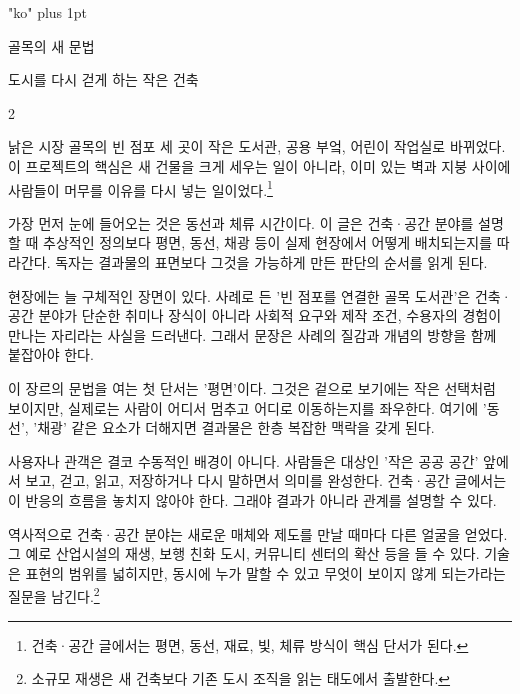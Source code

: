 \documentclass[9.5pt]{memoir}
\begin{document}
\XeTeXlinebreaklocale "ko"
\XeTeXlinebreakskip=0pt plus 1pt

\renewcommand{\imprintrunninghead}{골목 재생}
\pagestyle{imprint}


\begin{center}
{\noindent\hone 골목의 새 문법\par}
\vspace{\imprintheadinggap}

{\noindent\htwo 도시를 다시 걷게 하는 작은 건축\par}
\end{center}


\begin{multicols*}{2}

{\bodyf\noindent 낡은 시장 골목의 빈 점포 세 곳이 작은 도서관, 공용 부엌, 어린이 작업실로 바뀌었다. 이 프로젝트의 핵심은 새 건물을 크게 세우는 일이 아니라, 이미 있는 벽과 지붕 사이에 사람들이 머무를 이유를 다시 넣는 일이었다.\footnote{건축·공간 글에서는 평면, 동선, 재료, 빛, 체류 방식이 핵심 단서가 된다.}\par}


{\bodyf\noindent 가장 먼저 눈에 들어오는 것은 동선과 체류 시간이다. 이 글은 건축·공간 분야를 설명할 때 추상적인 정의보다 평면, 동선, 채광 등이 실제 현장에서 어떻게 배치되는지를 따라간다. 독자는 결과물의 표면보다 그것을 가능하게 만든 판단의 순서를 읽게 된다.\par}


{\bodyf\noindent 현장에는 늘 구체적인 장면이 있다. 사례로 든 '빈 점포를 연결한 골목 도서관'은 건축·공간 분야가 단순한 취미나 장식이 아니라 사회적 요구와 제작 조건, 수용자의 경험이 만나는 자리라는 사실을 드러낸다. 그래서 문장은 사례의 질감과 개념의 방향을 함께 붙잡아야 한다.\par}


{\bodyf\noindent 이 장르의 문법을 여는 첫 단서는 '평면'이다. 그것은 겉으로 보기에는 작은 선택처럼 보이지만, 실제로는 사람이 어디서 멈추고 어디로 이동하는지를 좌우한다. 여기에 '동선', '채광' 같은 요소가 더해지면 결과물은 한층 복잡한 맥락을 갖게 된다.\par}


{\bodyf\noindent 사용자나 관객은 결코 수동적인 배경이 아니다. 사람들은 대상인 '작은 공공 공간' 앞에서 보고, 걷고, 읽고, 저장하거나 다시 말하면서 의미를 완성한다. 건축·공간 글에서는 이 반응의 흐름을 놓치지 않아야 한다. 그래야 결과가 아니라 관계를 설명할 수 있다.\par}


{\bodyf\noindent 역사적으로 건축·공간 분야는 새로운 매체와 제도를 만날 때마다 다른 얼굴을 얻었다. 그 예로 산업시설의 재생, 보행 친화 도시, 커뮤니티 센터의 확산 등을 들 수 있다. 기술은 표현의 범위를 넓히지만, 동시에 누가 말할 수 있고 무엇이 보이지 않게 되는가라는 질문을 남긴다.\footnote{소규모 재생은 새 건축보다 기존 도시 조직을 읽는 태도에서 출발한다.}\par}



\end{multicols*}
\end{document}
